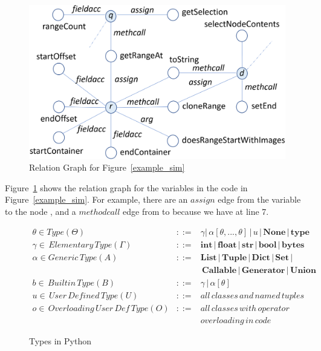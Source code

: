 \begin{figure}[t]
	\begin{center}
	  \includegraphics[width=0.9\columnwidth]{figures/relation-graph}
          \vspace{-6pt}
		\caption{Relation Graph for Figure~\ref{example_sim}}
		\label{rel-graph}
	\end{center}
\end{figure}

Figure~\ref{rel-graph} shows the relation graph for the variables in
the code in Figure~\ref{example_sim}. For example, there are an
$assign$ edge from the variable  to the node
, and a $methodcall$ edge from  to
 because we have  at line
7.




\begin{figure}[t]
  \small
  \begin{eqnarray*}
    \theta \in Type (\Theta) &::=& \gamma | \, \alpha [\theta, ..., \theta] \, | \, u \, | \, \mathbf{None} \, | \, \mathbf{type}\\
  \gamma \in \, Elementary \, Type (\Gamma) &::=& \mathbf{int} \, | \, \mathbf{float} \, | \, \mathbf{str} \, | \, \mathbf{bool} \, | \, \mathbf{bytes}\\
  \alpha \in Generic \, Type (A) &::=& \mathbf{List} \, | \, \mathbf{Tuple} \, | \, \mathbf{Dict} \, | \, \mathbf{Set} \, |\\
  & & \, \mathbf{Callable} \, | \, \mathbf{Generator} \, | \, \mathbf{Union}\\
  b \in \, Builtin \, Type (B) &::=& \gamma \, | \, \alpha[\theta]\\
  u \in \, User \, Defined \, Type (U) &::=& all \, classes \, and \, named \, tuples\\
  o \in \, Overloading \, User \, Def \, Type (O) &::=& all \, classes \, with \, operator \\
  & & overloading \, in \, code
  \end{eqnarray*}
  \vspace{-18pt}
\caption{Types in Python}
\label{python-types}
\end{figure}

